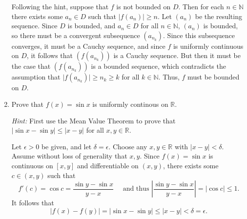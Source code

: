 \documentclass[letterpaper,12pt]{article}
\newcommand{\R}{\mathbb{R}}
\newcommand{\N}{\mathbb{N}}
\newcommand{\abs}[1]{\lvert #1\rvert}
\newcommand{\Abs}[1]{\left| #1\right|}
\begin{document}
\begin{enumerate}
\bigskip

Following the hint, suppose that $f$ is not bounded on $D$. Then for each $n\in\N$ there exists some $a_n\in D$ such that $\abs{f(a_n)}\geq n$. Let $(a_n)$ be the resulting sequence. Since $D$ is bounded, and $a_n\in D$ for all $n\in\N$, $(a_n)$ is bounded, so there must be a convergent subsequence $(a_{n_k})$. Since this subsequence converges, it must be a Cauchy sequence, and since $f$ is uniformly continuous on $D$, it follows that $(f(a_{n_k}))$ is a Cauchy sequence. But then it must be the case that $(f(a_{n_k}))$ is a bounded sequence, which contradicts the assumption that $\abs{f(a_{n_k})}\geq n_k\geq k$ for all $k\in\N$. Thus, $f$ must be bounded on $D$.

\bigskip

\item Prove that $f(x)=\sin x$ is uniformly continous on $\R$.

{\em Hint:} First use the Mean Value Theorem to prove that $\abs{\sin x-\sin y}\leq \abs{x-y}$ for all $x,y\in\R$.

\bigskip

Let $\epsilon>0$ be given, and let $\delta = \epsilon$. Choose any $x,y\in\R$ with $\abs{x-y}<\delta$. Assume without loss of generality that $x,y$. Since $f(x)=\sin x$ is continuous on $[x,y]$ and differentiable on $(x,y)$, there exists some $c\in (x,y)$ such that 
\[
 f'(c) = \cos c = \frac{\sin y-\sin x}{y-x} \quad \text{ and thus } \Abs{\frac{\sin y-\sin x}{y-x}} = \abs{\cos c}\leq 1.
\]
It follows that
\[
 \abs{f(x)-f(y)} = \abs{\sin x-\sin y}\leq \abs{x-y}<\delta = \epsilon.
\]


\end{enumerate}
\end{document}
